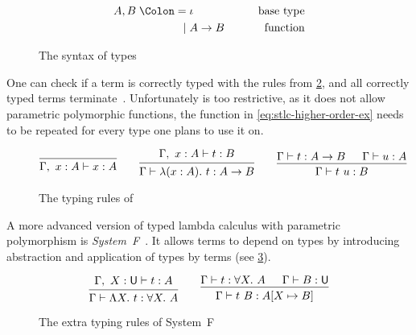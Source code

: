 \begin{figure}
  \begin{alignat*}{2}
    A, B \Coleqq{} & \iota   & \qquad\text{base type} \\
    \mid{}         & A \to B & \qquad\text{function}
  \end{alignat*}
  \caption{The syntax of  types}\label{fig:stlc-type-syntax}
\end{figure}

One can check if a term is correctly typed with the rules from
\cref{fig:stlc-typing}, and all correctly typed terms
terminate~\cite{type-Barendregt, type-Pierce}. Unfortunately  is too
restrictive, as it does not allow parametric polymorphic functions, the function
in \cref{eq:stlc-higher-order-ex} needs to be repeated for every type one plans
to use it on.

\begin{figure}
  \begin{equation*}
    \begin{prooftree}
      \infer0{\Gamma,\ x : A \vdash x : A}
    \end{prooftree}
    \qquad
    \begin{prooftree}
      \hypo{\Gamma,\ x : A \vdash t : B}
      \infer1{\Gamma \vdash \lambda (x : A).\ t : A \to B}
    \end{prooftree}
    \qquad
    \begin{prooftree}
      \hypo{\Gamma \vdash t : A \to B}
      \hypo{\Gamma \vdash u : A}
      \infer2{\Gamma \vdash t\ u : B }
    \end{prooftree}
  \end{equation*}
  \caption{The typing rules of }\label{fig:stlc-typing}
\end{figure}

A more advanced version of typed lambda calculus with parametric polymorphism is
\emph{System~F}~\cite{type-Pierce, type-Girard, tt-Nederpelt}. It allows terms
to depend on types by introducing abstraction and application of types by terms
(see \cref{fig:systemf-typing}).

\begin{figure}
  \begin{equation*}
    \begin{prooftree}
      \hypo{\Gamma,\ X : \Univ \vdash t : A}
      \infer1{\Gamma \vdash \Lambda X.\ t : \forall X.\ A}
    \end{prooftree}
    \qquad
    \begin{prooftree}
      \hypo{\Gamma \vdash t : \forall X.\ A}
      \hypo{\Gamma \vdash B : \Univ}
      \infer2{\Gamma \vdash t\ B : A[X \mapsto B]}
    \end{prooftree}
  \end{equation*}
  \caption{The extra typing rules of System~F}\label{fig:systemf-typing}
\end{figure}

